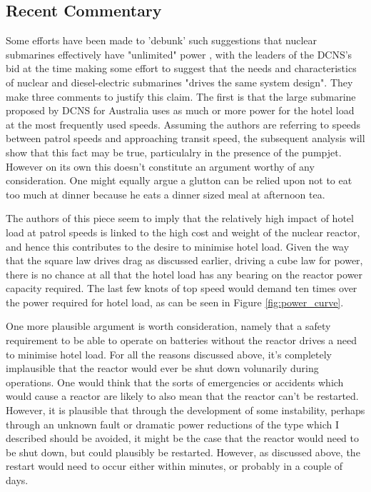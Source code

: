 \documentclass{article}\usepackage[]{graphicx}\usepackage[]{color}
\begin{document}
\subsection{Recent Commentary}
Some efforts have been made to 'debunk' such suggestions that nuclear submarines effectively have "unlimited" power \parencite{autret2016}, with the leaders of the DCNS's bid at the time making some effort to suggest that the needs and characteristics of nuclear and diesel-electric submarines "drives the same system design". They make three comments to justify this claim.  The first is that the large submarine proposed by DCNS for Australia uses as much or more power for the hotel load at the most frequently used speeds.  Assuming the authors are referring to speeds between patrol speeds and approaching transit speed, the subsequent analysis will show that this fact may be true, particulalry in the presence of the pumpjet. However on its own this doesn't constitute an argument worthy of any consideration. One might equally argue a glutton can be relied upon not to eat too much at dinner because he eats a dinner sized meal at afternoon tea.

The authors of this piece seem to imply that the relatively high impact of hotel load at patrol speeds is linked to the high cost and weight of the nuclear reactor, and hence this contributes to the desire to minimise hotel load.  Given the way that the square law drives drag as discussed earlier, driving a cube law for power, there is no chance at all that the hotel load has any bearing on the reactor power capacity required.  The last few knots of top speed would demand ten times over the power required for hotel load, as can be seen in Figure \ref{fig:power_curve}.

One more plausible argument is worth consideration, namely that a safety requirement to be able to operate on batteries without the reactor drives a need to minimise hotel load. For all the reasons discussed above, it's completely implausible that the reactor would ever be shut down volunarily during operations.  One would think that the sorts of emergencies or accidents which would cause a reactor are likely to also mean that the reactor can't be restarted.  However, it is plausible that through the development of some instability, perhaps through an unknown fault or dramatic power reductions of the type which I described should be avoided, it might be the case that the reactor would need to be shut down, but could plausibly be restarted.  However, as discussed above, the restart would need to occur either within minutes, or probably in a couple of days.
\end{document}
